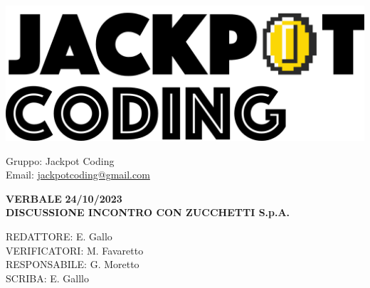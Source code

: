 \documentclass[5pt]{article}
\begin{document}
\begin{minipage}[t]{0.50\textwidth}
    \begin{flushleft}
        \hspace{10pt}
        \includegraphics[scale=0.65]{assets/jackpot-logo.png} 
    \end{flushleft}
\end{minipage}
\hspace{-60pt} %
\begin{flushright}
    \begin{minipage}[t]{0.50\textwidth}
        \begin{flushright}
            Gruppo: {\Large Jackpot Coding}\\
            Email: \href{mailto:jackpotcoding@gmail.com}{jackpotcoding@gmail.com}
        \end{flushright}
    \end{minipage}
\end{flushright}

\vspace{24pt}

\begin{center}
    \textbf{\large VERBALE }
    \textbf{\large 24/10/2023} \\
    \textbf{\Large DISCUSSIONE INCONTRO CON ZUCCHETTI S.p.A.}
\end{center}

\vspace{13pt}

\begin{flushleft}
    \begin{spacing}{1.5}
        REDATTORE: E. Gallo\\%
        VERIFICATORI: M. Favaretto \\
        RESPONSABILE: G. Moretto\\%
        \vspace{7pt}
        SCRIBA: E. Galllo\\%
    \end{spacing}
\end{flushleft}
\end{document}
